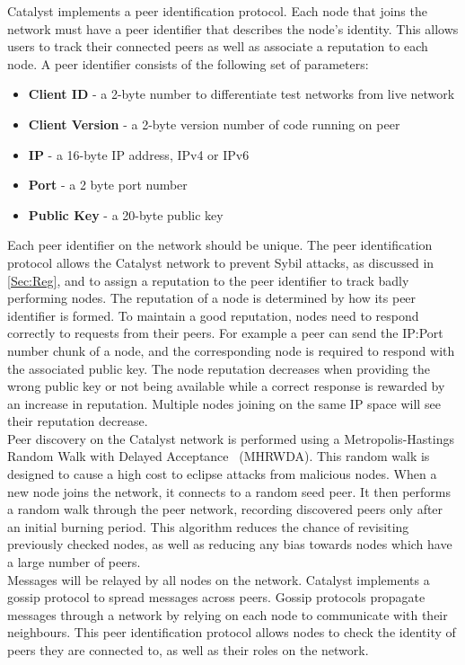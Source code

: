 Catalyst implements a peer identification protocol. Each node that joins the network must have a peer identifier that describes the node’s identity. This allows users to track their connected peers as well as associate a reputation to each node. A peer identifier consists of the following set of parameters:

\begin{itemize}
\item \textbf{Client ID} - a 2-byte number to differentiate test networks from live network
\item \textbf{Client Version} - a 2-byte version number of code running on peer 
\item \textbf{IP} - a 16-byte IP address, IPv4 or IPv6
\item \textbf{Port} - a 2 byte port number 
\item \textbf{Public Key} - a 20-byte public key
\end{itemize}

Each peer identifier on the network should be unique. The peer identification protocol allows the Catalyst network to prevent Sybil attacks, as discussed in \ref{Sec:Reg}, and to assign a reputation to the peer identifier to track badly performing nodes. The reputation of a node is determined by how its peer identifier is formed. To maintain a good reputation, nodes need to respond correctly to requests from their peers. For example a peer can send the IP:Port number chunk of a node, and the corresponding node is required to respond with the associated public key. The node reputation decreases when providing the wrong public key or not being available while a correct response is rewarded by an increase in reputation. Multiple nodes joining on the same IP space will see their reputation decrease. \\

Peer discovery on the Catalyst network is performed using a Metropolis-Hastings Random Walk with Delayed Acceptance~\cite{hasting} (MHRWDA). This random walk is designed to cause a high cost to eclipse attacks from malicious nodes. When a new node joins the network, it connects to a random seed peer. It then performs a random walk through the peer network, recording discovered peers only after an initial burning period. This algorithm reduces the chance of revisiting previously checked nodes, as well as reducing any bias towards nodes which have a large number of peers. \\

Messages will be relayed by all nodes on the network. Catalyst implements a gossip protocol to spread messages across peers. Gossip protocols propagate messages through a network by relying on each node to communicate with their neighbours. This peer identification protocol allows nodes to check the identity of peers they are connected to, as well as their roles on the network. 